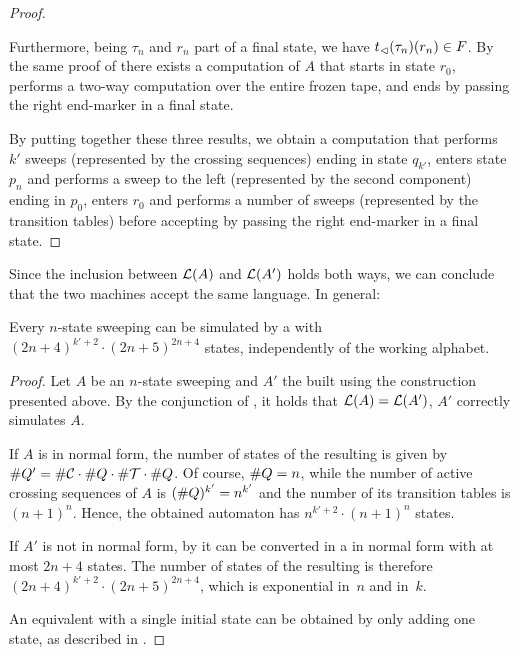 \begin{proof}
\begin{enumerate}
		      Furthermore, being $\tau_n$ and $r_n$ part of a final state, we have $t_\lhd(\tau_n)(r_n)\in F$.
		      By the same proof of  there exists a computation of $A$ that starts in state $r_0$, performs a two-way computation over the entire frozen tape, and ends by passing the right end-marker in a final state.
	\end{enumerate}
	By putting together these three results, we obtain a computation that performs $k'$ sweeps (represented by the crossing sequences) ending in state $q_{k'}$, enters state $p_n$ and performs a sweep to the left (represented by the second component) ending in $p_0$, enters $r_0$ and performs a number of sweeps (represented by the transition tables) before accepting by passing the right end-marker in a final state.
\end{proof}

Since the inclusion between $\mathcal L(A)$ and $\mathcal L(A')$ holds both ways, we can conclude that the two machines accept the same language.
In general:
\begin{thrm}\label{thm:swkLAtoNFA}
	Every $n$-state sweeping \kDLA can be simulated by a \ONFA with $(2n+4)^{k'+2}\cdot(2n+5)^{2n+4}$ states, independently of the working alphabet.
\end{thrm}
\begin{proof}
	Let $A$ be an $n$-state sweeping \kDLA and $A'$ the \ONFA built using the construction presented above.
	By the conjunction of , it holds that $\mathcal L(A)=\mathcal L(A')$, \ie $A'$ correctly simulates $A$.

	If $A$ is in normal form, the number of states of the resulting \ONFA is given by $\# Q'=\# \mathcal C\cdot\# Q\cdot\# \mathcal T\cdot\# Q$.
	Of course, $\# Q=n$, while the number of active crossing sequences of $A$ is $(\# Q)^{k'}=n^{k'}$ and the number of its transition tables is $(n+1)^n$.
	Hence, the obtained automaton has $n^{k'+2}\cdot(n+1)^n$ states.

	If $A'$ is not in normal form, by  it can be converted in a \kDLA in normal form with at most $2n+4$ states.
	The number of states of the resulting \ONFA is therefore $(2n+4)^{k'+2}\cdot(2n+5)^{2n+4}$, which is exponential in~$n$ and in~$k$.

	An equivalent \ONFA with a single initial state can be obtained by only adding one state, as described in .
\end{proof}

